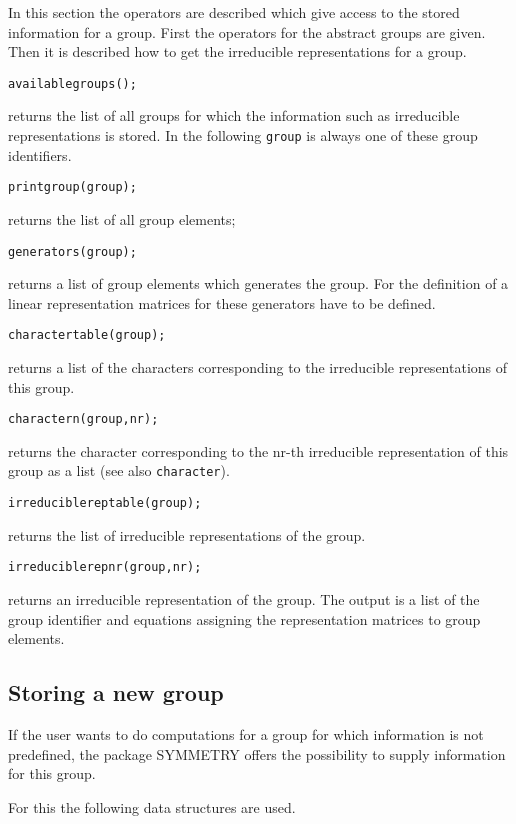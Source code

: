 In this section the operators are described which give access to the
stored information for a group.
First the operators for the abstract groups are given.
Then it is described how to get the irreducible representations
for a group.

{\tt availablegroups();}

returns the list of all groups for which the information such as
irreducible representations is stored. In the following {\tt group}
is always one of these group identifiers.

{\tt printgroup(group);}

returns the list of all group elements;

{\tt generators(group);}

returns a list of group elements which generates the group. For the
definition of a linear representation matrices for these generators
have to be defined.

{\tt charactertable(group);}

returns a list of the characters corresponding to the irreducible
representations of this group.

{\tt charactern(group,nr);}

returns the character corresponding to the nr-th irreducible representation
of this group as a list (see also {\tt character}).

{\tt irreduciblereptable(group);}

returns the list of irreducible representations of the group.

{\tt irreduciblerepnr(group,nr);}

returns an irreducible representation of the group. The output
is a list of the group identifier and equations
assigning the representation matrices to group elements.

\subsection{Storing a new group}

If the user wants to do computations for a group for which
information is not predefined,
the package SYMMETRY offers the possibility to supply information
for this group.

For this the following data structures are used.

